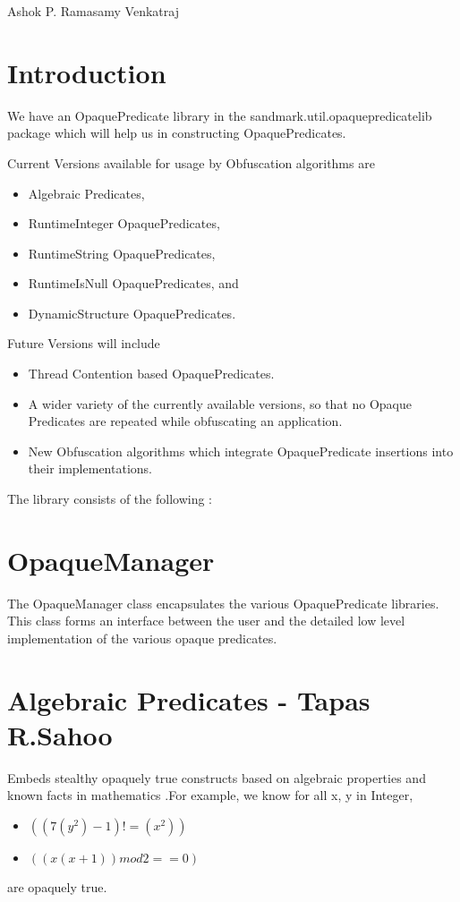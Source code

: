 %
	  {Ashok P. Ramasamy Venkatraj}

\section{Introduction}
We have an OpaquePredicate library in the sandmark.util.opaquepredicatelib 
package which will help us in constructing OpaquePredicates.

Current Versions available for usage by Obfuscation algorithms are 
\begin{itemize}
	\item Algebraic Predicates, 
	\item RuntimeInteger OpaquePredicates, 
	\item RuntimeString OpaquePredicates, 
	\item RuntimeIsNull OpaquePredicates, and 
	\item DynamicStructure OpaquePredicates.
\end{itemize}

Future Versions will include 
\begin{itemize}
	\item Thread Contention based OpaquePredicates.
	\item A wider variety of the currently available versions, so that no Opaque
	Predicates are repeated while obfuscating an application.
	\item New Obfuscation algorithms which integrate OpaquePredicate insertions
	into their implementations.
\end{itemize}

The library consists of the following :
\section{OpaqueManager} 
The OpaqueManager class encapsulates the various OpaquePredicate libraries. 
This class forms an interface between the user and the detailed low level 
implementation of the various opaque predicates. 

\section{Algebraic Predicates - Tapas R.Sahoo}
	Embeds stealthy opaquely true constructs based on algebraic properties 
and known facts in mathematics .For example, we know for all x, y in Integer, 
\begin{itemize}
   \item $( (7(y^{2}) - 1) != (x^{2}) )$
   \item $((x(x+1)) mod 2 == 0)$
\end{itemize} 
are opaquely true.



